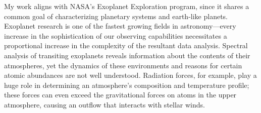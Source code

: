My work aligns with NASA's Exoplanet Exploration program, since it shares a common goal of characterizing planetary systems and earth-like planets. Exoplanet research is one of the fastest growing fields in astronomy---every increase in the sophistication of our observing capabilities necessitates a proportional increase in the complexity of the resultant data analysis. Spectral analysis of transiting exoplanets reveals information about the contents of their atmospheres, yet the dynamics of these environments and reasons for certain atomic abundances are not well understood. Radiation forces, for example, play a huge role in determining an atmosphere's composition and temperature profile; these forces can even exceed the gravitational forces on atoms in the upper atmosphere, causing an outflow that interacts with stellar winds.